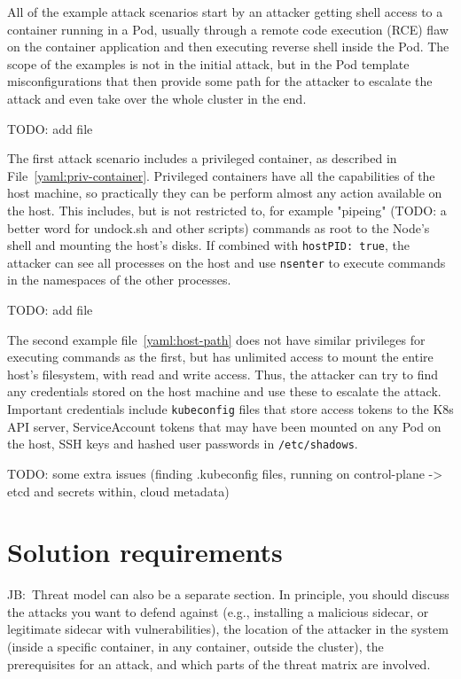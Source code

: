 \documentclass[english, 12pt, a4paper, sci, utf8, a-2b, online]{aaltothesis}
\newcommand{\mycomment}[3]{\textcolor{#1}{#2:~#3}}
\newcommand{\jb}[1]{\noindent\mycomment{aaltoRed}{JB}{#1}}
\begin{document}
All of the example attack scenarios start by an attacker getting shell access to a container running in a Pod, usually through a remote code execution (RCE) flaw on the container application and then executing reverse shell inside the Pod. The scope of the examples is not in the initial attack, but in the Pod template misconfigurations that then provide some path for the attacker to escalate the attack and even take over the whole cluster in the end.

TODO: add file \label{yaml:priv-container}

The first attack scenario includes a privileged container, as described in File~\ref{yaml:priv-container}. Privileged containers have all the capabilities of the host machine, so practically they can be perform almost any action available on the host. This includes, but is not restricted to, for example "pipeing" (TODO: a better word for undock.sh and other scripts) commands as root to the Node's shell and mounting the host's disks. If combined with \texttt{hostPID:\ true}, the attacker can see all processes on the host and use \texttt{nsenter} to execute commands in the namespaces of the other processes.

TODO: add file \label{yaml:host-path}

The second example file~\ref{yaml:host-path} does not have similar privileges for executing commands as the first, but has unlimited access to mount the entire host's filesystem, with read and write access. Thus, the attacker can try to find any credentials stored on the host machine and use these to escalate the attack. Important credentials include \texttt{kubeconfig} files that store access tokens to the K8s API server, ServiceAccount tokens that may have been mounted on any Pod on the host, SSH keys and hashed user passwords in \texttt{/etc/shadows}.

TODO: some extra issues (finding .kubeconfig files, running on control-plane -> etcd and secrets within, cloud metadata)

\clearpage

\section{Solution requirements} \label{sec:methods}

\jb{Threat model can also be a separate section. In principle, you should discuss the attacks you want to defend against (e.g., installing a malicious sidecar, or legitimate sidecar with vulnerabilities), the location of the attacker in the system (inside a specific container, in any container, outside the cluster),
the prerequisites for an attack, and which parts of the threat matrix are involved.}
\end{document}
